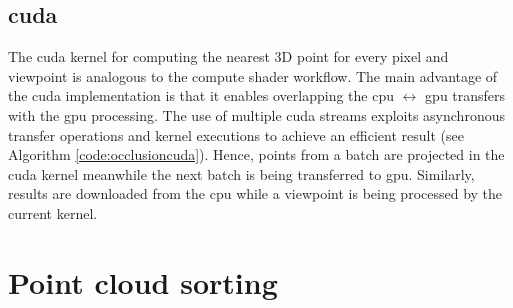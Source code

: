 \subsection{\acrshort{cuda}}

The \acrshort{cuda} kernel for computing the nearest 3D point for every pixel and viewpoint is analogous to the compute shader workflow. The main advantage of the \acrshort{cuda} implementation is that it enables overlapping the \acrshort{cpu} $\leftrightarrow$ \acrshort{gpu} transfers with the \acrshort{gpu} processing. The use of multiple \acrshort{cuda} streams exploits asynchronous transfer operations and kernel executions to achieve an efficient result (see Algorithm \ref{code:occlusioncuda}). Hence, points from a batch are projected in the \acrshort{cuda} kernel meanwhile the next batch is being transferred to \acrshort{gpu}. Similarly, results are downloaded from the \acrshort{cpu} while a viewpoint is being processed by the current kernel.

\vspace{3mm}



\section{Point cloud sorting}

